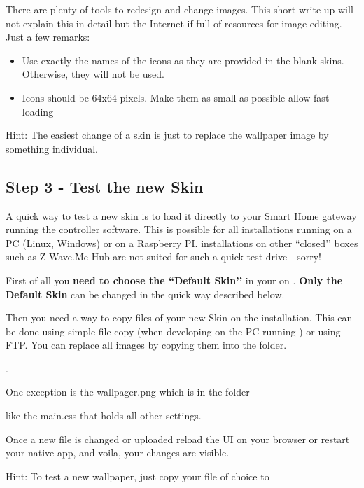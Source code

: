 There are plenty of tools to redesign and change images. This short write up will not 
explain this in detail but the Internet if full of resources for image editing. Just a few remarks:

\begin{itemize}
\item Use exactly the names of the icons as they are provided in the blank skins. Otherwise, they will not be used.
\item Icons should be 64x64 pixels. Make them as small as possible allow fast loading
\end{itemize}

Hint: The easiest change of a skin is just to replace the wallpaper image by something individual.

\subsection{Step 3 - Test the new Skin}

A quick way to test a new skin is to load it directly to your Smart Home gateway running the 
\zway controller software. This is possible for all \zway installations running on a PC 
(Linux, Windows) or on a Raspberry PI. \zway installations on other ``closed’’ boxes such 
as Z-Wave.Me Hub are not suited for such a quick test drive---sorry!

First of all you \textbf{need to choose the ``Default Skin’’} in your \zwshui on
. \textbf{Only the Default Skin} 
can be changed in the quick way described below.

Then you need a way to copy files of your new Skin on the \zway installation. This can 
be done using simple file copy (when developing on the PC running \zway) or using FTP. 
You can replace all images by copying them into the folder.

.

One exception is the wallpager.png which is in the folder



like the main.css that holds all other settings.

Once a new file is changed or uploaded reload the UI on your browser or restart your 
native app, and voila, your changes are visible.

Hint: To test a new wallpaper, just copy your file of choice to

